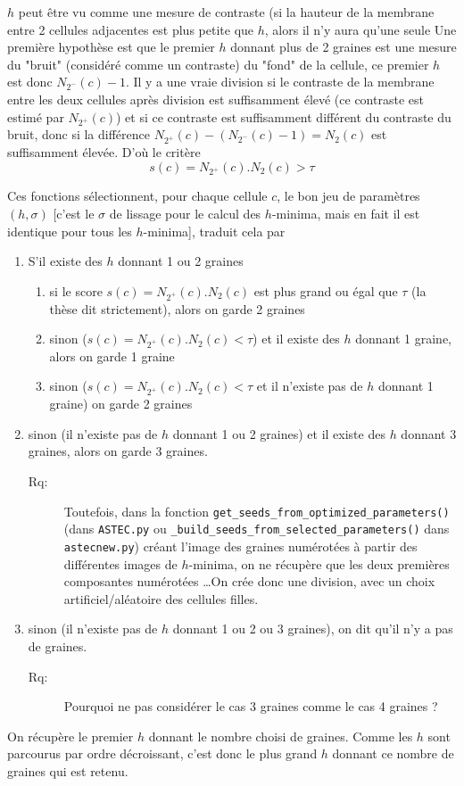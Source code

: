 \documentclass{article}
\newenvironment{remarque}{\color{red}\begin{description}\item[Rq:]}
{\end{description}\color{black}}
\begin{document}
$h$ peut \^etre vu comme une mesure de contraste (si la hauteur de la membrane entre 2 cellules adjacentes est plus petite que $h$, alors il n'y aura qu'une seule 
Une premi\`ere hypoth\`ese est que le premier $h$ donnant plus de 2 graines est une mesure du "bruit" (consid\'er\'e comme un contraste) du "fond" de la cellule, ce premier $h$ est donc $N_{2^{-}}(c) - 1$. Il y a une vraie division si le contraste de la membrane entre les deux cellules apr\`es division est suffisamment \'elev\'e (ce contraste est estim\'e par $N_{2^{+}}(c)$) et si ce contraste est suffisamment diff\'erent du contraste du bruit, donc si la diff\'erence $N_{2^{+}}(c) - (N_{2^{-}}(c) - 1) = N_{2}(c)$ est suffisamment \'elev\'ee. D'o\`u le crit\`ere
\begin{equation}
s(c) = N_{2^{+}}(c) . N_{2}(c) > \tau
\end{equation}


Ces fonctions s\'electionnent, pour chaque cellule $c$, le bon jeu de param\`etres $(h,\sigma)$ [c'est le $\sigma$ de lissage pour le calcul des $h$-minima, mais en fait il est identique pour tous les $h$-minima], traduit cela par
\begin{enumerate}
\itemsep -0.5ex
\item S'il existe des $h$ donnant 1 ou 2 graines
\begin{enumerate}
\itemsep -0.5ex
\item si le score $s(c) = N_{2^{+}}(c) . N_2(c)$ est plus grand ou \'egal que $\tau$ (la th\`ese dit strictement), alors on garde 2 graines
\item sinon ($s(c) = N_{2^{+}}(c) . N_2(c) <\tau$) et il existe des $h$ donnant 1 graine, alors on garde 1 graine
\item sinon ($s(c) = N_{2^{+}}(c) . N_2(c) <\tau$ et il n'existe pas de $h$ donnant 1 graine) on garde 2 graines
\end{enumerate}
\item sinon (il n'existe pas de $h$ donnant 1 ou 2 graines) et il existe des $h$ donnant 3 graines, alors on garde 3 graines.
\begin{remarque}
Toutefois, dans la fonction \verb|get_seeds_from_optimized_parameters()| (dans \verb|ASTEC.py| ou \verb|_build_seeds_from_selected_parameters()| dans \verb|astecnew.py|)
cr\'eant l'image des graines num\'erot\'ees \`a partir des diff\'erentes images de $h$-minima, on ne r\'ecup\`ere que les deux premi\`eres composantes num\'erot\'ees \ldots On cr\'ee donc une division, avec un choix artificiel/al\'eatoire des cellules filles.
\end{remarque}
\item sinon  (il n'existe pas de $h$ donnant 1 ou 2 ou 3 graines), on dit qu'il n'y a pas de graines.
\begin{remarque}
Pourquoi ne pas consid\'erer le cas 3 graines comme le cas 4 graines ?
\end{remarque}
\end{enumerate}
On r\'ecup\`ere le premier $h$ donnant le nombre choisi de graines. Comme les $h$ sont parcourus par ordre d\'ecroissant, c'est donc le plus grand $h$ donnant ce nombre de graines qui est retenu.
\end{document}
